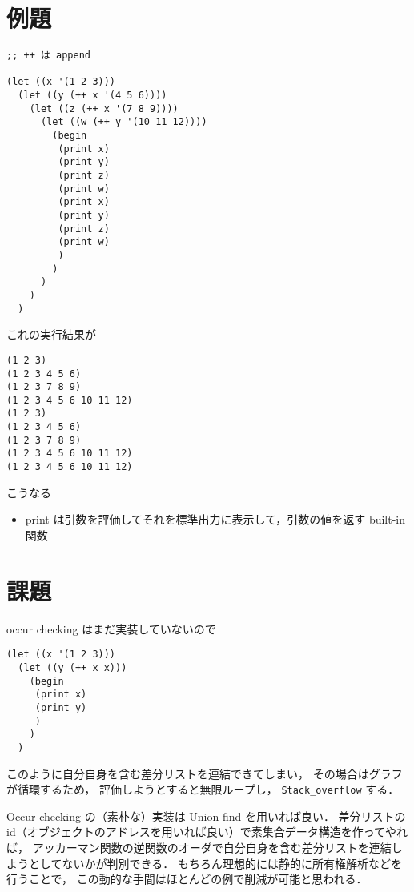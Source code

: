 \documentclass[10pt, a4j, twocolumn]{scrartcl}
\begin{document}
\section{例題}
\label{sec:orga3c2914}

\begin{lstlisting}
;; ++ は append

(let ((x '(1 2 3)))
  (let ((y (++ x '(4 5 6))))
    (let ((z (++ x '(7 8 9))))
      (let ((w (++ y '(10 11 12))))
        (begin
         (print x)
         (print y)
         (print z)
         (print w)
         (print x)
         (print y)
         (print z)
         (print w)
         )
        )
      )
    )
  )
\end{lstlisting}


これの実行結果が

\begin{verbatim}
(1 2 3)
(1 2 3 4 5 6)
(1 2 3 7 8 9)
(1 2 3 4 5 6 10 11 12)
(1 2 3)
(1 2 3 4 5 6)
(1 2 3 7 8 9)
(1 2 3 4 5 6 10 11 12)
(1 2 3 4 5 6 10 11 12)
\end{verbatim}

こうなる
\begin{itemize}
\item print は引数を評価してそれを標準出力に表示して，引数の値を返す built-in 関数
\end{itemize}


\section{課題}
\label{sec:orgfb1a8de}

occur checking はまだ実装していないので

\begin{lstlisting}
(let ((x '(1 2 3)))
  (let ((y (++ x x)))
    (begin
     (print x)
     (print y)
     )
    )
  )
\end{lstlisting}

このように自分自身を含む差分リストを連結できてしまい，
その場合はグラフが循環するため，
評価しようとすると無限ループし， \texttt{Stack\_overflow} する．

Occur checking の（素朴な）実装は Union-find を用いれば良い．
差分リストの id（オブジェクトのアドレスを用いれば良い）で素集合データ構造を作ってやれば，
アッカーマン関数の逆関数のオーダで自分自身を含む差分リストを連結しようとしてないかが判別できる．
もちろん理想的には静的に所有権解析などを行うことで，
この動的な手間はほとんどの例で削減が可能と思われる．
\end{document}
